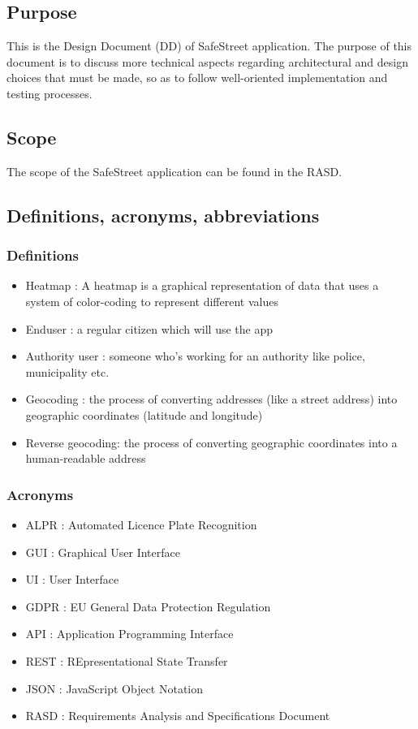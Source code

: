 \subsection{Purpose}
This is the Design Document (DD) of SafeStreet application. The purpose of this document is to discuss more technical aspects regarding architectural and design choices that must be made, so as to follow well-oriented implementation and testing processes.

\subsection{Scope}
The scope of the SafeStreet application can be found in the RASD.

\subsection{Definitions,  acronyms,  abbreviations}

\subsubsection{Definitions}
\begin{itemize}
  \item Heatmap : A heatmap is a graphical representation of data that uses a system of color-coding to represent different values
  \item Enduser : a regular citizen which will use the app
  \item Authority user : someone who's working for an authority like police, municipality etc.
  \item Geocoding : the process of converting addresses (like a street address) into geographic coordinates (latitude and longitude)
  \item Reverse geocoding:  the process of converting geographic coordinates into a human-readable address

\end{itemize}

\subsubsection{Acronyms}
\begin{itemize}
  \item ALPR : Automated Licence Plate Recognition
  \item GUI : Graphical User Interface
  \item UI : User Interface
  \item GDPR : EU General Data Protection Regulation
  \item API : Application Programming Interface
  \item REST : REpresentational State Transfer
  \item JSON : JavaScript Object Notation
  \item RASD : Requirements Analysis and Specifications Document
\end{itemize}

